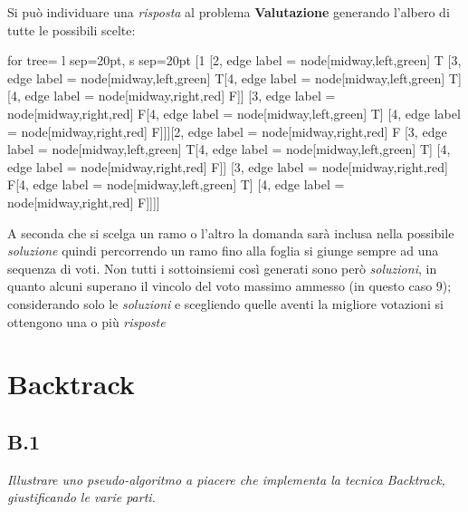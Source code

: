 \documentclass[a4paper]{article}
\begin{document}
\begin{itemize}
		Si può individuare una \emph{risposta} al problema \textbf{Valutazione} generando l'albero di tutte le possibili scelte:
		\begin{center}
			\begin{forest}
				for tree={ l sep=20pt, s sep=20pt}
			[1 [2, edge label = {node[midway,left,green] {T}} [3, edge label = {node[midway,left,green] {T}}[4, edge label = {node[midway,left,green] {T}}] [4, edge label = {node[midway,right,red] {F}}]] [3, edge label = {node[midway,right,red] {F}}[4, edge label = {node[midway,left,green] {T}}] [4, edge label = {node[midway,right,red] {F}}]]][2, edge label = {node[midway,right,red] {F}} [3, edge label = {node[midway,left,green] {T}}[4, edge label = {node[midway,left,green] {T}}] [4, edge label = {node[midway,right,red] {F}}]] [3, edge label = {node[midway,right,red] {F}}[4, edge label = {node[midway,left,green] {T}}] [4, edge label = {node[midway,right,red] {F}}]]]] 			\end{forest}
		\end{center}
		A seconda che si scelga un ramo o l'altro la domanda sarà inclusa nella possibile \emph{soluzione} quindi percorrendo un ramo fino alla foglia si giunge sempre ad una sequenza di voti.
		Non tutti i sottoinsiemi così generati sono però \emph{soluzioni}, in quanto alcuni superano il vincolo del voto massimo ammesso (in questo caso 9); considerando solo le \emph{soluzioni} e scegliendo quelle aventi la migliore votazioni si ottengono una o più \emph{risposte}
\end{itemize}
\section{Backtrack}
\subsection{B.1}
\emph{Illustrare uno pseudo-algoritmo a piacere che implementa la tecnica Backtrack, giustificando le varie parti.}
\end{document}
